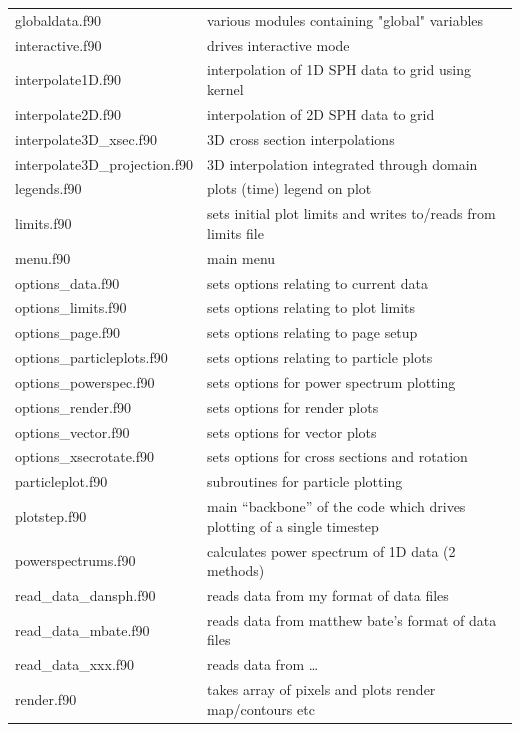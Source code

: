\documentclass[a4paper,10pt]{article}
\begin{document}
\begin{longtable}{|lp{}|}
     globaldata.f90         & various modules containing "global" variables\\
     interactive.f90        & drives interactive mode\\
     interpolate1D.f90	 & interpolation of 1D SPH data to grid using kernel\\
     interpolate2D.f90	 & interpolation of 2D SPH data to grid     \\
     interpolate3D\_xsec.f90 & 3D cross section interpolations\\
     interpolate3D\_projection.f90	 & 3D interpolation integrated through domain\\
     legends.f90		       & plots (time) legend on plot\\
     limits.f90                   & sets initial plot limits and writes to/reads from limits file\\
     menu.f90               & main menu\\
     options\_data.f90       & sets options relating to current data\\
     options\_limits.f90     & sets options relating to plot limits\\
     options\_page.f90       & sets options relating to page setup\\
     options\_particleplots.f90 & sets options relating to particle plots\\
     options\_powerspec.f90  & sets options for power spectrum plotting\\
     options\_render.f90	 & sets options for render plots\\
     options\_vector.f90	 & sets options for vector plots\\
     options\_xsecrotate.f90 & sets options for cross sections and rotation\\
     particleplot.f90       & subroutines for particle plotting\\
     plotstep.f90           & main ``backbone'' of the code which drives plotting of a single timestep\\
     powerspectrums.f90     & calculates power spectrum of 1D data (2 methods)\\
     read\_data\_dansph.f90   & reads data from my format of data files\\
     read\_data\_mbate.f90    & reads data from matthew bate's format of data files\\
     read\_data\_xxx.f90 & reads data from \ldots \\ 
     render.f90	 	 & takes array of pixels and plots render map/contours etc\\

\end{longtable}
\end{document}
